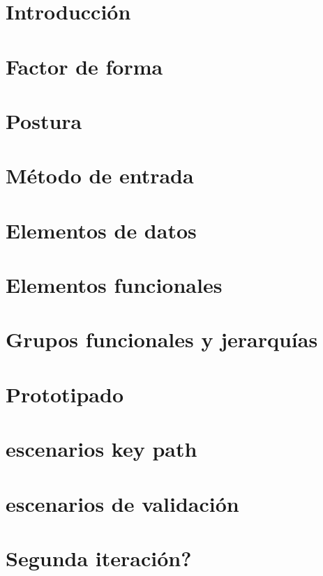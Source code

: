 \section{Introducción}
\section{Factor de forma}
\section{Postura}
\section{Método de entrada}
\section{Elementos de datos}
\section{Elementos funcionales}
\section{Grupos funcionales y jerarquías}
\section{Prototipado}
\section{escenarios key path}
\section{escenarios de validación}
\section{Segunda iteración?}
